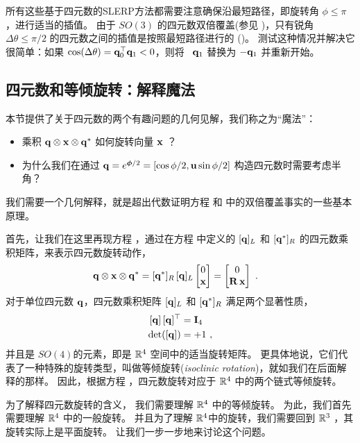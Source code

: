 所有这些基于四元数的SLERP方法都需要注意确保沿最短路径，即旋转角 $\phi\leq\pi$，进行适当的插值。
由于 $SO(3)$ 的四元数双倍覆盖(参见 )，只有锐角 $\Delta\theta\leq\pi/2$ 的四元数之间的插值是按照最短路径进行的 ()。
测试这种情况并解决它很简单：如果 $\cos(\Delta\theta)={\bf q}_0^{\top}{\bf q}_1<0$，则将 \eg~${\bf q}_1$ 替换为 $-{\bf q}_1$ 并重新开始。



\subsection{四元数和等倾旋转：解释魔法}
\label{sec:isoclinic}

本节提供了关于四元数的两个有趣问题的几何见解，我们称之为“魔法”：
\begin{itemize}
\item
乘积 ${\bf q}\otimes{\bf x}\otimes{\bf q}^*$ 如何旋转向量 ${\bf x}$ ？
\item
为什么我们在通过 ${\bf q}=e^{{\bm \phi}/2}=[\cos \phi/2 , {\bf u}\sin\phi/2]$ 构造四元数时需要考虑半角？
\end{itemize}
%
我们需要一个几何解释，就是超出代数证明方程  和  中的双倍覆盖事实的一些基本原理。

首先，让我们在这里再现方程  ，通过在方程  中定义的 $[{\bf q}]_L$ 和 $[{\bf q}^*]_R$ 的四元数乘积矩阵，来表示四元数旋转动作，
%
\begin{align*}
{\bf q}\otimes
{\bf x}\otimes{\bf q}^*
&= [{\bf q}^*]_R\,[{\bf q}]_L\begin{bmatrix}
0 \\ {\bf x}
\end{bmatrix} 
= \begin{bmatrix}
0 \\ {\bf R}\,{\bf x}
\end{bmatrix} 
~.
\end{align*}
%
对于单位四元数 ${\bf q}$，四元数乘积矩阵 $[{\bf q}]_L$ 和 $[{\bf q}^*]_R$ 满足两个显著性质，
%
%
\begin{align}
 [{\bf q}]\,[{\bf q}]^{\top} &= {\bf I}_4 \\
 \det([{\bf q}]) &= +1 
 ~, 
\end{align}%
%
并且是 $SO(4)$的元素，即是 ${\mathbb R}^4$ 空间中的适当旋转矩阵。 
更具体地说，它们代表了一种特殊的旋转类型，叫做等倾旋转(\emph{isoclinic rotation})，就如我们在后面解释的那样。
因此，根据方程  ，四元数旋转对应于 ${\mathbb R}^4$ 中的两个链式等倾旋转。

为了解释四元数旋转的含义， %
我们需要理解 ${\mathbb R}^4$ 中的等倾旋转。
为此，我们首先需要理解 ${\mathbb R}^4$ 中的一般旋转。
并且为了理解 ${\mathbb R}^4$中的旋转，我们需要回到 ${\mathbb R}^3$ ，其旋转实际上是平面旋转。
让我们一步一步地来讨论这个问题。


